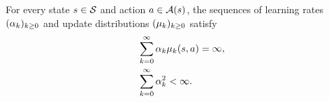 \begin{definition}
\label{asp: stochastic conditions on effective learning rate}
    For every state $s \in \mathcal{S}$ and action $a \in \mathcal{A}(s)$,
    the sequences of learning rates $(\alpha_k)_{k \geq 0}$ and update distributions $(\mu_k)_{k \geq 0}$ satisfy
        \begin{align}
            \label{eq: xtn robbins-monro first}
            &\sum_{k = 0}^{\infty} \alpha_k \mu_k(s,a) = \infty , 
            \\
            \label{eq: xtn robbins-monro second}
            &\sum_{k = 0}^{\infty} \alpha_k^2 < \infty .
        \end{align}
\end{definition}